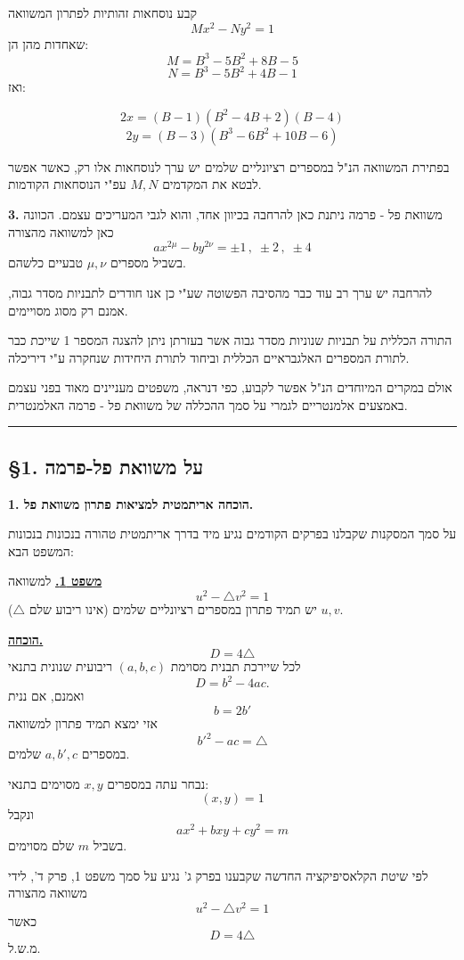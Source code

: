 \medskip
קבע נוסחאות זהותיות לפתרון המשוואה
\[ Mx^2 - Ny^2 = 1 \]
שאחדות מהן הן:
\[ M = B^3 - 5B^2 + 8B - 5 \]
\[ N = B^3 - 5B^2 + 4B - 1 \]
ואז:

\[ 2x = (B-1)(B^2 - 4B + 2)(B-4) \]
\[ 2y = (B-3)(B^3 - 6B^2 + 10B - 6) \]

בפתירת המשוואה הנ"ל במספרים רציונליים שלמים יש ערך לנוסחאות אלו רק, כאשר אפשר לבטא את המקדמים $M, N$ עפ"י הנוסחאות הקודמות.

\medskip
\noindent\textbf{3.} משוואת פל - פרמה ניתנת כאן להרחבה בכיוון אחד, והוא לגבי המעריכים עצמם. הכוונה כאן למשוואה מהצורה
\[ ax^{2\mu} - by^{2\nu} = \pm 1 \, , \; \pm 2 \, , \; \pm 4 \]
בשביל מספרים $\mu, \nu$ טבעיים כלשהם.

להרחבה יש ערך רב עוד כבר מהסיבה הפשוטה שע"י כן אנו חודרים לתבניות מסדר גבוה, אמנם רק מסוג מסויימים.

התורה הכללית על תבניות שנוניות מסדר גבוה אשר בעזרתן ניתן להצגה המספר 1 שייכת כבר לתורת המספרים האלגבראיים הכללית וביחוד לתורת היחידות שנחקרה ע"י דיריכלה.

אולם במקרים המיוחדים הנ"ל אפשר לקבוע, כפי דנראה, משפטים מעניינים מאוד בפני עצמם באמצעים אלמנטריים לגמרי על סמך ההכללה של משוואת פל - פרמה האלמנטרית.

\rule{4cm}{0.5pt}

\subsection*{\S1. על משוואת פל-פרמה}

\noindent\textbf{1. הוכחה אריתמטית למציאות פתרון משוואת פל.}

על סמך המסקנות שקבלנו בפרקים הקודמים נגיע מיד בדרך אריתמטית טהורה בנכונות בנכונות המשפט הבא:

\bigskip
\noindent\textbf{\underline{משפט 1.}}
למשוואה
\[ u^2 - \triangle v^2 = 1 \]
($\triangle$ אינו ריבוע שלם)
יש תמיד פתרון במספרים רציונליים שלמים $u, v$.

\bigskip
\noindent\textbf{\underline{הוכחה.}}
\[ D = 4\triangle \tag{1} \]
לכל שיירכת תבנית מסוימת $(a,b,c)$ ריבועית שנונית בתנאי
\[ D = b^2 - 4ac . \tag{2} \]
ואמנם, אם ננית
\[ b = 2b' \tag{3} \]
אזי ימצא תמיד פתרון למשוואה
\[ b'^2 - ac = \triangle \tag{4} \]
במספרים $a, b', c$ שלמים.

נבחר עתה במספרים $x, y$ מסוימים בתנאי:
\[ (x,y) = 1 \tag{5} \]
ונקבל
\[ ax^2 + bxy + cy^2 = m \tag{6} \]
בשביל $m$ שלם מסוימים.

לפי שיטת הקלאסיפיקציה החדשה שקבענו בפרק ג' נגיע על סמך משפט 1, פרק ד', לידי משוואה מהצורה
\[ u^2 - \triangle v^2 = 1 \tag{7} \]
כאשר
\[ D = 4\triangle \]
\hfill מ.ש.ל.

